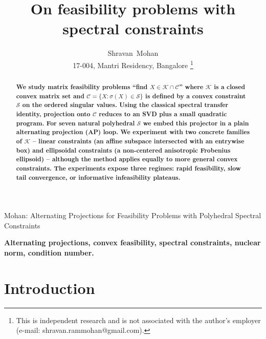 \documentclass[journal]{IEEEtran}
\begin{document}
\title{On feasibility problems with spectral constraints}

\author{Shravan~Mohan\\
17-004, Mantri Residency, Bangalore%
\thanks{This is independent research and is not associated with the
author's employer (e-mail: shravan.rammohan@gmail.com).}}

%
{Mohan: Alternating Projections for Feasibility Problems with Polyhedral Spectral Constraints}

\maketitle

\begin{abstract}
\textbf{We study matrix feasibility problems ``find
$X \in \mathcal{K} \cap \mathcal{C}$'' where $\mathcal{K}$ is a closed
convex matrix set and $\mathcal{C} = \{X : \sigma(X) \in \mathcal{S}\}$
is defined by a convex constraint $\mathcal{S}$ on the ordered singular
values. Using the classical spectral transfer identity, projection onto
$\mathcal{C}$ reduces to an SVD plus a small quadratic program. For
seven natural polyhedral $\mathcal{S}$ we embed this projector in a
plain alternating projection (AP) loop. We experiment with two concrete
families of $\mathcal{K}$ -- linear constraints (an affine subspace
intersected with an entrywise box) and ellipsoidal constraints (a
non-centered anisotropic Frobenius ellipsoid) -- although the method
applies equally to more general convex constraints. The experiments
expose three regimes: rapid feasibility, slow tail convergence, or
informative infeasibility plateaus.}
\end{abstract}

\begin{IEEEkeywords}
\textbf{Alternating projections, convex feasibility, spectral constraints,
nuclear norm, condition number.}
\end{IEEEkeywords}

\IEEEpeerreviewmaketitle

\section{Introduction}\label{sec:intro}
\end{document}
